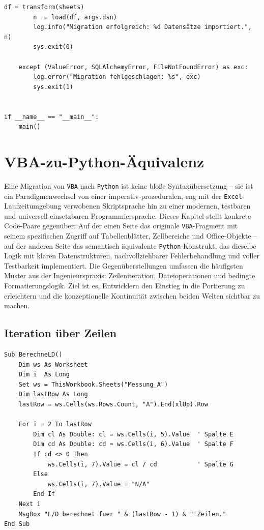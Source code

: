 \documentclass[12pt,a4paper]{report}
\theoremstyle{definition}
\theoremstyle{remark}
\newcommand{\excel}{\texttt{Excel}}
\newcommand{\vba}{\texttt{VBA}}
\newcommand{\py}{\texttt{Python}}
\begin{document}
\begin{lstlisting}[style=python, caption={migrate.py: Vollständige ETL-Pipeline}, label=lst:etl]
        df = transform(sheets)
        n  = load(df, args.dsn)
        log.info("Migration erfolgreich: %d Datensätze importiert.", n)
        sys.exit(0)

    except (ValueError, SQLAlchemyError, FileNotFoundError) as exc:
        log.error("Migration fehlgeschlagen: %s", exc)
        sys.exit(1)


if __name__ == "__main__":
    main()
\end{lstlisting}

\chapter{VBA-zu-Python-Äquivalenz}

Eine Migration von \vba{} nach \py{} ist keine bloße Syntaxübersetzung -- sie ist ein Paradigmenwechsel von einer imperativ-prozeduralen, eng mit der \excel{}-Laufzeitumgebung verwobenen Skriptsprache hin zu einer modernen, testbaren und universell einsetzbaren Programmiersprache. Dieses Kapitel stellt konkrete Code-Paare gegenüber: Auf der einen Seite das originale \vba{}-Fragment mit seinem spezifischen Zugriff auf Tabellenblätter, Zellbereiche und Office-Objekte -- auf der anderen Seite das semantisch äquivalente \py{}-Konstrukt, das dieselbe Logik mit klaren Datenstrukturen, nachvollziehbarer Fehlerbehandlung und voller Testbarkeit implementiert. Die Gegenüberstellungen umfassen die häufigsten Muster aus der Ingenieurspraxis: Zeileniteration, Dateioperationen und bedingte Formatierungslogik. Ziel ist es, Entwicklern den Einstieg in die Portierung zu erleichtern und die konzeptionelle Kontinuität zwischen beiden Welten sichtbar zu machen.

\section{Iteration über Zeilen}

\begin{lstlisting}[style=vba, caption={VBA: Iteration mit For Each}]
Sub BerechneLD()
    Dim ws As Worksheet
    Dim i  As Long
    Set ws = ThisWorkbook.Sheets("Messung_A")
    Dim lastRow As Long
    lastRow = ws.Cells(ws.Rows.Count, "A").End(xlUp).Row

    For i = 2 To lastRow
        Dim cl As Double: cl = ws.Cells(i, 5).Value  ' Spalte E
        Dim cd As Double: cd = ws.Cells(i, 6).Value  ' Spalte F
        If cd <> 0 Then
            ws.Cells(i, 7).Value = cl / cd           ' Spalte G
        Else
            ws.Cells(i, 7).Value = "N/A"
        End If
    Next i
    MsgBox "L/D berechnet fuer " & (lastRow - 1) & " Zeilen."
End Sub
\end{lstlisting}
\end{document}
